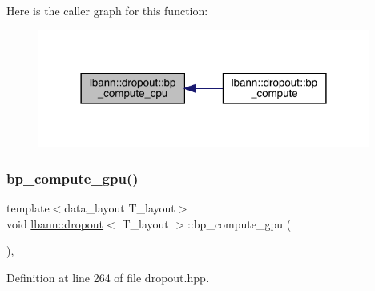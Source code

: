 Here is the caller graph for this function\+:\nopagebreak
\begin{figure}[H]
\begin{center}
\leavevmode
\includegraphics[width=309pt]{classlbann_1_1dropout_aca0160de0c3db5c29a0c4c6bddd0cf4f_icgraph}
\end{center}
\end{figure}
\mbox{\label{classlbann_1_1dropout_aeafadecbcfc81734d0c1850b4004dcc3}} 
\subsubsection{\texorpdfstring{bp\+\_\+compute\+\_\+gpu()}{bp\_compute\_gpu()}}
{\footnotesize\ttfamily template$<$data\+\_\+layout T\+\_\+layout$>$ \\
void \hyperlink{classlbann_1_1dropout}{lbann\+::dropout}$<$ T\+\_\+layout $>$\+::bp\+\_\+compute\+\_\+gpu (\begin{DoxyParamCaption}{ }\end{DoxyParamCaption})\hspace{0.3cm}{\ttfamily [inline]}, {\ttfamily [private]}}



Definition at line 264 of file dropout.\+hpp.



